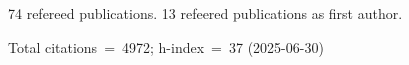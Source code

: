 74 refereed publications. 13 refeered publications as first author.

Total citations~=~4972; h-index~=~37 (2025-06-30)